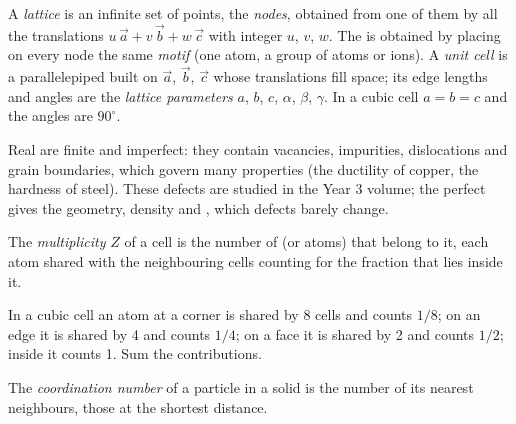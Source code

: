 \begin{definition}\label{def:b1:crystals-metals:lattice}
A \emph{lattice} is an infinite set of points, the
\emph{nodes}, obtained from one of them by all the
translations $u\,\vec a + v\,\vec b + w\,\vec c$ with integer $u$, $v$,
$w$. The  is obtained by placing on every node the same
\emph{motif} (one atom, a group of atoms or ions). A
\emph{unit cell} is a parallelepiped built on
$\vec a$, $\vec b$, $\vec c$ whose translations fill space; its edge
lengths and angles are the \emph{lattice parameters}
$a$, $b$, $c$, $\alpha$, $\beta$, $\gamma$. In a cubic cell
$a = b = c$ and the angles are $90^\circ$.
\end{definition}

\begin{remark}\label{rem:b1:crystals-metals:real}
Real  are finite and imperfect: they contain vacancies,
impurities, dislocations and grain boundaries, which govern many
properties (the ductility of copper, the hardness of steel). These
defects are studied in the Year 3 volume; the perfect  gives the
geometry, density and , which defects barely change.
\end{remark}

\begin{definition}\label{def:b1:crystals-metals:multiplicity}
The \emph{multiplicity} $Z$ of a cell is the number of
 (or atoms) that belong to it, each atom shared with the
neighbouring cells counting for the fraction that lies inside it.
\end{definition}

\begin{method}\label{met:b1:crystals-metals:count}
In a cubic cell an atom at a corner is shared by 8 cells and counts
$1/8$; on an edge it is shared by 4 and counts $1/4$; on a face it is
shared by 2 and counts $1/2$; inside it counts 1. Sum the contributions.
\end{method}

\begin{definition}\label{def:b1:crystals-metals:coordination}
The \emph{coordination number} of a particle
in a solid is the number of its nearest neighbours, those at the
shortest distance.
\end{definition}

